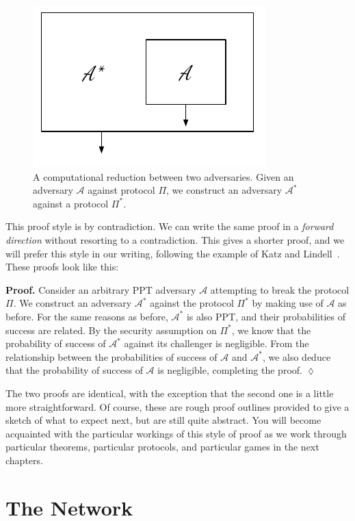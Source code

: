 \begin{figure}[h]
    \centering
    \includegraphics[width=0.4 \columnwidth,keepaspectratio]{figures/reduction.pdf}
    \caption{A computational reduction between two adversaries. Given an adversary
    $\mathcal{A}$ against protocol $\Pi$, we construct an adversary $\mathcal{A}^*$
    against a protocol $\Pi^*$.}
    \label{fig.reduction}
\end{figure}

This proof style is by contradiction. We can write the same proof in a \emph{forward
direction} without resorting to a contradiction. This gives a shorter proof, and we
will prefer this style in our writing, following the example of Katz and
Lindell~\cite{katz}. These proofs look like this:

\noindent
\textbf{Proof. } Consider an arbitrary PPT adversary $\mathcal{A}$ attempting to break
the protocol $\Pi$. We construct an adversary $\mathcal{A}^*$ against the protocol
$\Pi^*$ by making use of $\mathcal{A}$ as before. For the same reasons as before,
$\mathcal{A}^*$ is also PPT, and their probabilities of success are related. By the
security assumption on $\Pi^*$, we know that the probability of success of $\mathcal{A}^*$
against its challenger is negligible. From the relationship between the probabilities
of success of $\mathcal{A}$ and $\mathcal{A}^*$, we also deduce that the probability
of success of $\mathcal{A}$ is negligible, completing the proof. $\lozenge$

The two proofs are identical, with the exception that the second one is a little more
straightforward. Of course, these are rough proof outlines provided to give a sketch
of what to expect next, but are still quite abstract.
You will become acquainted with the particular workings of this style of proof as we work
through particular theorems, particular protocols, and particular games in the next chapters.

\section{The Network}

